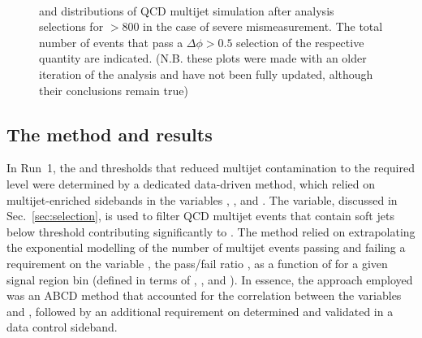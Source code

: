 \begin{figure}[!h]
 \centering
  \\
 \caption{\bdphi and \dphimhtj distributions of QCD multijet simulation
 after analysis selections for \scalht $> 800$ \GeV in the case of
 severe mismeasurement. The
 total number of events that pass a $\Delta\phi > 0.5$ selection of the
 respective quantity are indicated. (N.B. these plots were made with
 an older iteration of the analysis and have not been fully updated,
 although their conclusions remain true)}
 \label{fig:bDPhi_mismeasured}
\end{figure}

\subsection{The method and results}

In Run~1, the \alphat and \bdphi thresholds that reduced
multijet contamination to the required level were determined by a
dedicated data-driven method, which relied on multijet-enriched
sidebands in the variables \alphat, \bdphi, and \mhtmet. The \mhtmet
variable, discussed in Sec.~\ref{sec:selection}, is used to filter QCD
multijet events that contain soft jets below threshold contributing
significantly to \mht. The method relied on extrapolating the
exponential modelling of the number of multijet events passing and
failing a requirement on the variable \mhtmet, \ie the pass/fail ratio
\rmhtmet, as a function of \alphat for a given signal region bin
(defined in terms of \njet, \nb, and \scalht). In essence, the
approach employed was an ABCD method that accounted for the
correlation between the variables \rmhtmet and \alphat, followed
by an additional requirement on \bdphi determined and validated in a
data control sideband.

